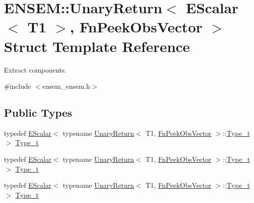 \hypertarget{structENSEM_1_1UnaryReturn_3_01EScalar_3_01T1_01_4_00_01FnPeekObsVector_01_4}{}\section{E\+N\+S\+EM\+:\+:Unary\+Return$<$ E\+Scalar$<$ T1 $>$, Fn\+Peek\+Obs\+Vector $>$ Struct Template Reference}
\label{structENSEM_1_1UnaryReturn_3_01EScalar_3_01T1_01_4_00_01FnPeekObsVector_01_4}


Extract components.  




{\ttfamily \#include $<$ensem\+\_\+ensem.\+h$>$}

\subsection*{Public Types}
\begin{DoxyCompactItemize}
\item 
typedef \mbox{\hyperlink{classENSEM_1_1EScalar}{E\+Scalar}}$<$ typename \mbox{\hyperlink{structENSEM_1_1UnaryReturn}{Unary\+Return}}$<$ T1, \mbox{\hyperlink{structENSEM_1_1FnPeekObsVector}{Fn\+Peek\+Obs\+Vector}} $>$\+::\mbox{\hyperlink{structENSEM_1_1UnaryReturn_3_01EScalar_3_01T1_01_4_00_01FnPeekObsVector_01_4_ab344f63bc162dc2012f97d027b589de9}{Type\+\_\+t}} $>$ \mbox{\hyperlink{structENSEM_1_1UnaryReturn_3_01EScalar_3_01T1_01_4_00_01FnPeekObsVector_01_4_ab344f63bc162dc2012f97d027b589de9}{Type\+\_\+t}}
\item 
typedef \mbox{\hyperlink{classENSEM_1_1EScalar}{E\+Scalar}}$<$ typename \mbox{\hyperlink{structENSEM_1_1UnaryReturn}{Unary\+Return}}$<$ T1, \mbox{\hyperlink{structENSEM_1_1FnPeekObsVector}{Fn\+Peek\+Obs\+Vector}} $>$\+::\mbox{\hyperlink{structENSEM_1_1UnaryReturn_3_01EScalar_3_01T1_01_4_00_01FnPeekObsVector_01_4_ab344f63bc162dc2012f97d027b589de9}{Type\+\_\+t}} $>$ \mbox{\hyperlink{structENSEM_1_1UnaryReturn_3_01EScalar_3_01T1_01_4_00_01FnPeekObsVector_01_4_ab344f63bc162dc2012f97d027b589de9}{Type\+\_\+t}}
\item 
typedef \mbox{\hyperlink{classENSEM_1_1EScalar}{E\+Scalar}}$<$ typename \mbox{\hyperlink{structENSEM_1_1UnaryReturn}{Unary\+Return}}$<$ T1, \mbox{\hyperlink{structENSEM_1_1FnPeekObsVector}{Fn\+Peek\+Obs\+Vector}} $>$\+::\mbox{\hyperlink{structENSEM_1_1UnaryReturn_3_01EScalar_3_01T1_01_4_00_01FnPeekObsVector_01_4_ab344f63bc162dc2012f97d027b589de9}{Type\+\_\+t}} $>$ \mbox{\hyperlink{structENSEM_1_1UnaryReturn_3_01EScalar_3_01T1_01_4_00_01FnPeekObsVector_01_4_ab344f63bc162dc2012f97d027b589de9}{Type\+\_\+t}}
\end{DoxyCompactItemize}


